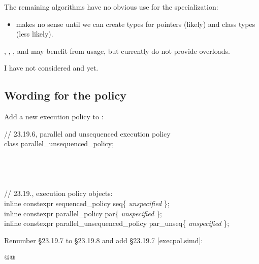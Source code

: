 The remaining algorithms have no obvious use for the specialization:
\begin{itemize}
  \item {} makes no sense until we can create  types for pointers (likely) and class types (less likely).
\end{itemize}

, , , and  may benefit from \simd usage, but currently do not provide  overloads.

I have not considered  and  yet.

\subsection{Wording for the policy}

Add a new execution policy to \citep[§23.19.2]{N4659}:
\begin{wgText}
  \begingroup
  \ttfamily
  // 23.19.6, parallel and unsequenced execution policy\\
  class parallel_unsequenced_policy;\\
  \\
  \\
  \\
  \\
  // 23.19., execution policy objects:\\
  inline constexpr sequenced_policy seq\{ \textit{unspecified} \};\\
  inline constexpr parallel_policy par\{ \textit{unspecified} \};\\
  inline constexpr parallel_unsequenced_policy par_unseq\{ \textit{unspecified} \};\\
  \endgroup
\end{wgText}

Renumber §23.19.7 to §23.19.8 and add §23.19.7 [execpol.simd]:
\begin{wgText}
  \begin{itemdecl}
@@
  \end{itemdecl}
  \begin{itemdescr}
    \pnum{}

    \pnum{}
  \end{itemdescr}
\end{wgText}

